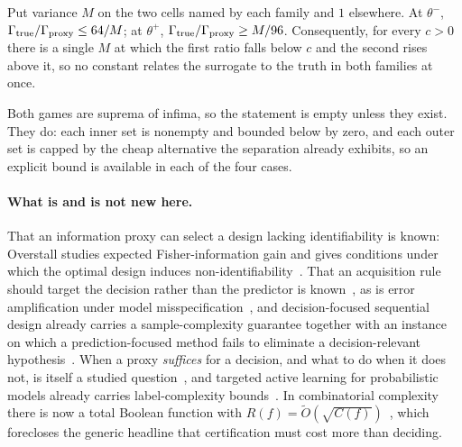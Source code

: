 
\begin{theorem}
\label{thm:sep}
Put variance $M$ on the two cells named by each family and $1$ elsewhere. At $\theta^{-}$,
$\Gamma_{\rm true}/\Gamma_{\rm proxy}\le64/M$; at $\theta^{+}$,
$\Gamma_{\rm true}/\Gamma_{\rm proxy}\ge M/96$. Consequently, for every $c>0$ there is a
single $M$ at which the first ratio falls below $c$ and the second rises above it, so no
constant relates the surrogate to the truth in both families at once.
\end{theorem}

Both games are suprema of infima, so the statement is empty unless they exist. They do: each
inner set is nonempty and bounded below by zero, and each outer set is capped by the cheap
alternative the separation already exhibits, so an explicit bound is available in each of
the four cases.



\paragraph{What is and is not new here.}
That an information proxy can select a design lacking identifiability is
known: Overstall studies expected Fisher-information gain and gives conditions under
which the optimal design induces non-identifiability~\cite{overstall2022}. That an
acquisition rule should target the decision rather than the predictor is
known~\cite{filstroff2021}, as is error amplification under model
misspecification~\cite{tang2026}, and decision-focused sequential design already carries
a sample-complexity guarantee together with an instance on which a prediction-focused
method fails to eliminate a decision-relevant hypothesis~\cite{wan2026}. When a proxy
\emph{suffices} for a decision, and what to do when it does not, is itself a studied
question~\cite{schutte2026}, and targeted active learning for probabilistic models already
carries label-complexity bounds~\cite{tosh2022}. In combinatorial
complexity there is now a total Boolean function with
$R(f)=\widetilde{O}(\sqrt{C(f)})$~\cite{bendavid2026}, which forecloses the generic
headline that certification must cost more than deciding.

